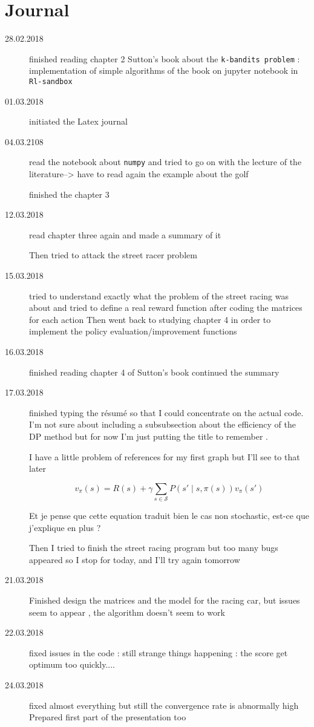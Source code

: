 \documentclass[14pt,a4paper]{article}
\def\code#1{\texttt{#1}}
\theoremstyle{definition}
\begin{document}
\newpage

\section{Journal}
\begin{description}
\item[28.02.2018] finished reading chapter 2 Sutton's book about the \code{k-bandits problem} : implementation of simple algorithms of the book on jupyter notebook in \code{Rl-sandbox}
\item[01.03.2018] initiated the Latex journal 
\item[04.03.2108]read the notebook about \code{numpy} and tried to go on with the lecture of the literature--> have to read again the example about the golf 

finished the chapter 3 
\item[12.03.2018] read chapter three again and made a summary of it

Then tried to attack the street racer problem 

\item[15.03.2018] tried to understand exactly what the problem of the street racing was about and tried to define a real reward function after coding the matrices for each action
Then went back to studying chapter 4 in order to implement the policy evaluation/improvement functions 

\item[16.03.2018] finished reading chapter 4 of Sutton's book continued the summary
\item[17.03.2018] finished typing the r\'{e}sum\'{e} so that I could concentrate on the actual code. I'm not sure about including a subsubsection about the efficiency of the DP method but for now I'm just putting the title to remember .

I have a little problem of references for my first graph but I'll see to that later 

\begin{equation}
v_{\pi}(s)=R(s)+\gamma \sum_{s \in \mathcal{S}} P(s' \mid s,\pi(s))v_{\pi}(s')
\label{bellman1}
\end{equation}

Et je pense que cette equation traduit  bien le cas non stochastic, est-ce que j'explique en plus ?

Then I tried to finish the street racing program but too many bugs appeared so I stop for today, and I'll try again tomorrow

\item[21.03.2018] Finished design the matrices and the model for the racing car, but issues seem to appear , the algorithm doesn't seem to work

\item[22.03.2018] fixed issues in the code : still strange things happening : the score get optimum too quickly....

\item[24.03.2018] fixed almost everything but still the convergence rate is abnormally high \\ Prepared first part of the presentation too 

\end{description}


\newpage



\end{document}
